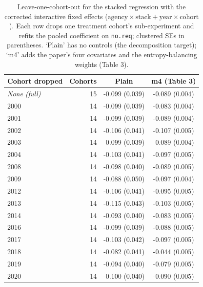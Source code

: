 \begin{table}[t]\centering
\caption{Leave-one-cohort-out for the stacked regression with the corrected
interactive fixed effects ($\text{agency}\times\text{stack} + \text{year}\times\text{cohort}$).
Each row drops one treatment cohort's sub-experiment and refits the pooled
coefficient on \texttt{no.req}; clustered SEs in parentheses. `Plain' has no
controls (the decomposition target); `m4' adds the paper's four covariates and
the entropy-balancing weights (Table 3).}
\label{tab:stacked-loo}
\begin{tabular}{lrcc}
\toprule
Cohort dropped & Cohorts & Plain & m4 (Table 3) \\
\midrule
\textit{None (full)} & 15 & -0.099 (0.039) & -0.089 (0.004) \\
\midrule
2000 & 14 & -0.099 (0.039) & -0.083 (0.004) \\
2001 & 14 & -0.099 (0.039) & -0.089 (0.004) \\
2002 & 14 & -0.106 (0.041) & -0.107 (0.005) \\
2003 & 14 & -0.099 (0.039) & -0.089 (0.004) \\
2004 & 14 & -0.103 (0.041) & -0.097 (0.005) \\
2008 & 14 & -0.098 (0.040) & -0.089 (0.005) \\
2009 & 14 & -0.088 (0.050) & -0.097 (0.004) \\
2012 & 14 & -0.106 (0.041) & -0.095 (0.005) \\
2013 & 14 & -0.115 (0.043) & -0.103 (0.005) \\
2014 & 14 & -0.093 (0.040) & -0.083 (0.005) \\
2016 & 14 & -0.099 (0.039) & -0.088 (0.005) \\
2017 & 14 & -0.103 (0.042) & -0.097 (0.005) \\
2018 & 14 & -0.082 (0.041) & -0.044 (0.005) \\
2019 & 14 & -0.094 (0.040) & -0.079 (0.005) \\
2020 & 14 & -0.100 (0.040) & -0.090 (0.005) \\
\bottomrule
\end{tabular}
\end{table}
